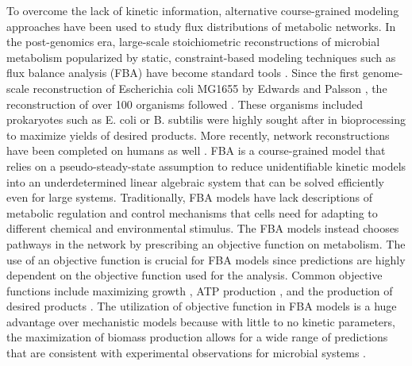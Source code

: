 \documentclass[12pt]{article}
\begin{document}
To overcome the lack of kinetic information, alternative course-grained modeling approaches have been used to study flux distributions of metabolic networks. In the post-genomics era, large-scale stoichiometric reconstructions of microbial metabolism popularized by static, constraint-based modeling techniques such as flux balance analysis (FBA) have become standard tools \cite{lewis2012constraining}. Since the first genome-scale reconstruction of Escherichia coli MG1655 by Edwards and Palsson \cite{edwards2000escherichia}, the reconstruction of over 100 organisms followed \cite{feist2009reconstruction}. These organisms included prokaryotes such as E. coli \cite{feist2007genome} or B. subtilis \cite{oh2007genome}  were highly sought after in bioprocessing to maximize yields of desired products. More recently, network reconstructions have been completed on humans as well \cite{duarte2007global,thiele2013community}. FBA is a course-grained model that relies on a pseudo-steady-state assumption to reduce unidentifiable kinetic models into an underdetermined linear algebraic system that can be solved efficiently even for large systems. Traditionally, FBA models have lack descriptions of metabolic regulation and control mechanisms that cells need for adapting to different chemical and environmental stimulus. The FBA models instead chooses pathways in the network by prescribing an objective function on metabolism. The use of an objective function is crucial for FBA models since predictions are highly dependent on the objective function used for the analysis. Common objective functions include maximizing growth \cite{lewis2012constraining,mahadevan2002dynamic,burgard2003optimization,edwards2002characterizing,van2002stoichiometric}, ATP production \cite{ramakrishna2001flux}, and the production of desired products \cite{varma1993biochemical}. The utilization of objective function in FBA models is a huge advantage over mechanistic models because with little to no kinetic parameters, the maximization of biomass production allows for a wide range of predictions that are consistent with experimental observations for microbial systems \cite{lewis2012constraining,mahadevan2002dynamic,schilling2002genome,edwards2001silico,ibarra2002escherichia,covert2002transcriptional,edwards2000robustness,burgard2003optimization}.
\end{document}

